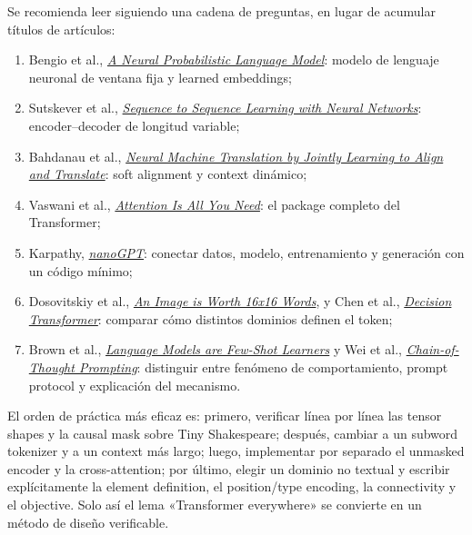 \documentclass[a4paper]{article}
\begin{document}
Se recomienda leer siguiendo una cadena de preguntas, en lugar de acumular títulos de artículos:

\begin{enumerate}
  \item Bengio et al., \href{https://www.jmlr.org/papers/v3/bengio03a.html}{\emph{A Neural Probabilistic Language Model}}: modelo de lenguaje neuronal de ventana fija y learned embeddings;
  \item Sutskever et al., \href{https://proceedings.neurips.cc/paper/2014/hash/a14ac55a4f27472c5d894ec1c3c743d2-Abstract.html}{\emph{Sequence to Sequence Learning with Neural Networks}}: encoder--decoder de longitud variable;
  \item Bahdanau et al., \href{https://arxiv.org/abs/1409.0473}{\emph{Neural Machine Translation by Jointly Learning to Align and Translate}}: soft alignment y context dinámico;
  \item Vaswani et al., \href{https://arxiv.org/abs/1706.03762}{\emph{Attention Is All You Need}}: el package completo del Transformer;
  \item Karpathy, \href{https://github.com/karpathy/nanoGPT}{\emph{nanoGPT}}: conectar datos, modelo, entrenamiento y generación con un código mínimo;
  \item Dosovitskiy et al., \href{https://arxiv.org/abs/2010.11929}{\emph{An Image is Worth 16x16 Words}}, y Chen et al., \href{https://arxiv.org/abs/2106.01345}{\emph{Decision Transformer}}: comparar cómo distintos dominios definen el token;
  \item Brown et al., \href{https://arxiv.org/abs/2005.14165}{\emph{Language Models are Few-Shot Learners}} y Wei et al., \href{https://arxiv.org/abs/2201.11903}{\emph{Chain-of-Thought Prompting}}: distinguir entre fenómeno de comportamiento, prompt protocol y explicación del mecanismo.
\end{enumerate}

El orden de práctica más eficaz es: primero, verificar línea por línea las tensor shapes y la causal mask sobre Tiny Shakespeare; después, cambiar a un subword tokenizer y a un context más largo; luego, implementar por separado el unmasked encoder y la cross-attention; por último, elegir un dominio no textual y escribir explícitamente la element definition, el position/type encoding, la connectivity y el objective. Solo así el lema «Transformer everywhere» se convierte en un método de diseño verificable.
\end{document}
